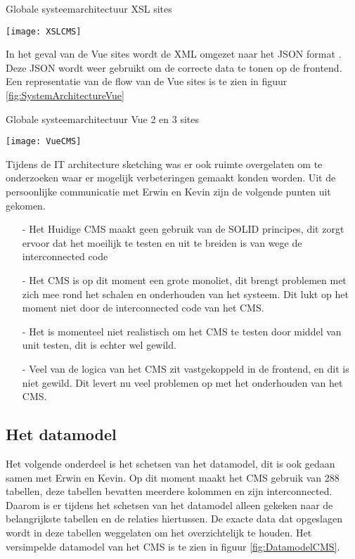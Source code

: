 \whitespace
\begin{graphic}
	\captionsetup{type=figure}
	\caption{Globale systeemarchitectuur \gls{XSL} sites}
	\texttt{[image: XSLCMS]}
	\label{fig:SystemArchitectureXSL}
\end{graphic}

\newpage

\whitespace
In het geval van de Vue sites wordt de XML omgezet naar het JSON format \parencite{JSON}.
Deze JSON wordt weer gebruikt om de correcte data te tonen op de frontend.
Een representatie van de flow van de Vue sites is te zien in figuur \ref{fig:SystemArchitectureVue}

\begin{graphic}
	\captionsetup{type=figure}
	\caption{Globale systeemarchitectuur Vue 2 en 3 sites}
	\texttt{[image: VueCMS]}
	\label{fig:SystemArchitectureVue}
\end{graphic}


\whitespace
Tijdens de IT architecture sketching was er ook ruimte overgelaten om te onderzoeken waar er mogelijk verbeteringen gemaakt konden worden.
Uit de persoonlijke communicatie met Erwin en Kevin zijn de volgende punten uit gekomen.

\begin{itemize}
	\item[-]{Het Huidige \gls{CMS} maakt geen gebruik van de SOLID principes, dit zorgt ervoor dat het moeilijk te testen en uit te breiden is van wege de interconnected code}
	\item[-]{Het \gls{CMS} is op dit moment een grote monoliet, dit brengt problemen met zich mee rond het schalen en onderhouden van het systeem.
	      Dit lukt op het moment niet door de interconnected code van het CMS.}
	\item[-]{Het is momenteel niet realistisch om het \gls{CMS} te testen door middel van unit testen, dit is echter wel gewild.}
	\item[-]{Veel van de logica van het CMS zit vastgekoppeld in de frontend, en dit is niet gewild.
	      Dit levert nu veel problemen op met het onderhouden van het CMS.}
\end{itemize}

\newpage
\subsection{Het datamodel}
\label{subsection:Datamodel}
Het volgende onderdeel is het schetsen van het datamodel, dit is ook gedaan samen met Erwin en Kevin.
Op dit moment maakt het \gls{CMS} gebruik van 288 tabellen, deze tabellen bevatten meerdere kolommen en zijn interconnected.
Daarom is er tijdens het schetsen van het datamodel alleen gekeken naar de belangrijkste tabellen en de relaties hiertussen.
De exacte data dat opgeslagen wordt in deze tabellen weggelaten om het overzichtelijk te houden.
Het versimpelde datamodel van het CMS is te zien in figuur \ref{fig:DatamodelCMS}.

